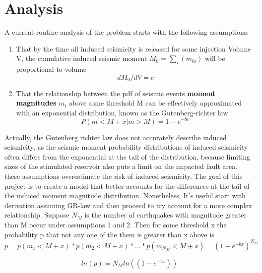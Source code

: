 \documentclass{article}
\begin{document}
\section{Analysis}
    A current routine analysis of the problem starts with the following assumptions: 
    \begin{enumerate}
        \item That by the time all induced seismicity is released for some injection Volume  V, the cumulative induced seismic moment $M_0 = \sum_i(m_{0i})$ will be proportional to volume
        \begin{equation}
        dM_0/dV = c
        \end{equation}
        \item That the relationship between the pdf of seismic events \textbf{moment magnitudes} $m_i$ above some threshold M can be effectively approximated with an exponential distribution, known as the Gutenberg-richter law
        \begin{equation}
        P(m<M+x|m>M) = 1-e^{-bx}
        \end{equation}        
    \end{enumerate}
    Actually, the Gutenberg richter law does not accurately describe induced seismicity, as the seismic moment probability distributions of induced seismicity often differs from the exponential  at the tail of the distribution, because limiting sizes of the stimulated  
    reservoir also puts a limit on the impacted fault area. \cite{Urban2016May} these assumptions overestimate the risk of induced seismicity. The goal of this project is to create a model that better accounts for the differences at the tail of the induced 
    moment magnitude distribution. Nonetheless, It's useful start with derivation assuming GR-law and then proceed to try account for a more complex relationship. 
    Suppose $N_M$ is the number of earthquakes with magnitude greater than M occur under assumptions 1 and 2. Then for some threshold x the probability p that not any one of the them is greater than x above  is 
\begin{equation}
\label{eqn:a}
    p = p(m_1<M+x)*p(m_2<M+x)*...*p(m_{N_M}<M+x) = (1-e^{-bx})^{N_M}
\end{equation}



\begin{equation}
    \tag{apply log}
    ln(p) = N_M ln((1-e^{-bx}))
    \label{eqn:d1}
    \end{equation}
    
\end{document}
